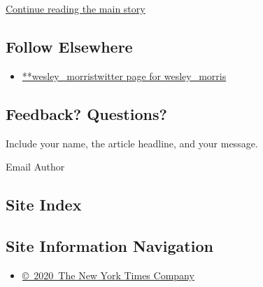 \protect\hyperlink{after-mid2}{Continue reading the main story}

\hypertarget{follow-elsewhere}{%
\subsection{Follow Elsewhere}\label{follow-elsewhere}}

\begin{itemize}
\tightlist
\item
  \href{https://twitter.com/wesley_morris}{**wesley\_morristwitter page
  for wesley\_morris}
\end{itemize}

\hypertarget{feedback-questions}{%
\subsection{Feedback? Questions?}\label{feedback-questions}}

Include your name, the article headline, and your message.

Email Author

\hypertarget{site-index}{%
\subsection{Site Index}\label{site-index}}

\hypertarget{site-information-navigation}{%
\subsection{Site Information
Navigation}\label{site-information-navigation}}

\begin{itemize}
\tightlist
\item
  \href{https://help.nytimes.com/hc/en-us/articles/115014792127-Copyright-notice}{©~2020~The
  New York Times Company}
\end{itemize}

